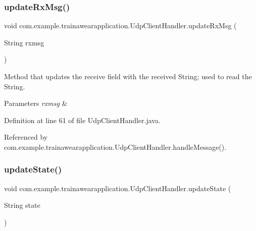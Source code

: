 \subsubsection{\texorpdfstring{updateRxMsg()}{updateRxMsg()}}
{\footnotesize\ttfamily void com.\+example.\+trainawearapplication.\+Udp\+Client\+Handler.\+update\+Rx\+Msg (\begin{DoxyParamCaption}\item[{String}]{rxmsg }\end{DoxyParamCaption})\hspace{0.3cm}{\ttfamily [private]}}



Method that updates the receive field with the received String; used to read the String. 


\begin{DoxyParams}{Parameters}
{\em rxmsg} & \\
\hline
\end{DoxyParams}


Definition at line 61 of file Udp\+Client\+Handler.\+java.


\begin{DoxyCode}{0}

\end{DoxyCode}


Referenced by com.\+example.\+trainawearapplication.\+Udp\+Client\+Handler.\+handle\+Message().

\mbox{\label{classcom_1_1example_1_1trainawearapplication_1_1_udp_client_handler_a65fd50027c6302d5c8d858e844fc3e6f}} 
\subsubsection{\texorpdfstring{updateState()}{updateState()}}
{\footnotesize\ttfamily void com.\+example.\+trainawearapplication.\+Udp\+Client\+Handler.\+update\+State (\begin{DoxyParamCaption}\item[{String}]{state }\end{DoxyParamCaption})\hspace{0.3cm}{\ttfamily [private]}}



